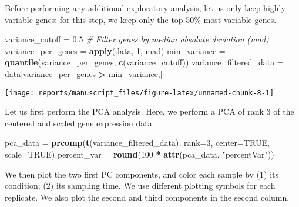 \documentclass[9pt,a4paper,]{extarticle}
\newenvironment{Shaded}{\begin{snugshade}}{\end{snugshade}}
\newcommand{\CommentTok}[1]{\textcolor[rgb]{0.56,0.35,0.01}{\textit{#1}}}
\newcommand{\DataTypeTok}[1]{\textcolor[rgb]{0.13,0.29,0.53}{#1}}
\newcommand{\DecValTok}[1]{\textcolor[rgb]{0.00,0.00,0.81}{#1}}
\newcommand{\FloatTok}[1]{\textcolor[rgb]{0.00,0.00,0.81}{#1}}
\newcommand{\KeywordTok}[1]{\textcolor[rgb]{0.13,0.29,0.53}{\textbf{#1}}}
\newcommand{\NormalTok}[1]{#1}
\newcommand{\OperatorTok}[1]{\textcolor[rgb]{0.81,0.36,0.00}{\textbf{#1}}}
\newcommand{\OtherTok}[1]{\textcolor[rgb]{0.56,0.35,0.01}{#1}}
\newcommand{\StringTok}[1]{\textcolor[rgb]{0.31,0.60,0.02}{#1}}
\begin{document}
Before performing any additional exploratory analysis, let us only keep highly
variable genes: for this step, we keep only the top 50\% most variable genes.

\begin{Shaded}
\begin{Highlighting}[]
\NormalTok{variance_cutoff =}\StringTok{ }\FloatTok{0.5}
\CommentTok{# Filter genes by median absolute deviation (mad)}
\NormalTok{variance_per_genes =}\StringTok{ }\KeywordTok{apply}\NormalTok{(data, }\DecValTok{1}\NormalTok{, mad)}
\NormalTok{min_variance =}\StringTok{ }\KeywordTok{quantile}\NormalTok{(variance_per_genes, }\KeywordTok{c}\NormalTok{(variance_cutoff))}
\NormalTok{variance_filtered_data =}\StringTok{ }\NormalTok{data[variance_per_genes }\OperatorTok{>}\StringTok{ }\NormalTok{min_variance,]}
\end{Highlighting}
\end{Shaded}

\begin{center}\texttt{[image: reports/manuscript\_files/figure-latex/unnamed-chunk-8-1]} \end{center}

Let us first perform the PCA analysis. Here, we perform a PCA of rank 3 of the
centered and scaled gene expression data.

\begin{Shaded}
\begin{Highlighting}[]
\NormalTok{pca_data =}\StringTok{ }\KeywordTok{prcomp}\NormalTok{(}\KeywordTok{t}\NormalTok{(variance_filtered_data), }\DataTypeTok{rank=}\DecValTok{3}\NormalTok{, }\DataTypeTok{center=}\OtherTok{TRUE}\NormalTok{, }\DataTypeTok{scale=}\OtherTok{TRUE}\NormalTok{) }
\NormalTok{percent_var =}\StringTok{ }\KeywordTok{round}\NormalTok{(}\DecValTok{100} \OperatorTok{*}\StringTok{ }\KeywordTok{attr}\NormalTok{(pca_data, }\StringTok{"percentVar"}\NormalTok{))}
\end{Highlighting}
\end{Shaded}

We then plot the two first PC components, and color each sample by (1) its
condition; (2) its sampling time. We use different plotting symbols for each
replicate. We also plot the second and third components in the second column.
\end{document}
